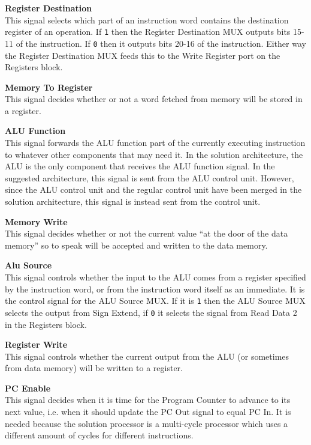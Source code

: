 \begin{description}
\item{\textbf{Register Destination}} \\
This signal selects which part of an instruction word contains the destination register of an operation.
If \texttt{1} then the Register Destination MUX outputs bits 15-11 of the instruction. If \texttt{0} then it outputs bits 20-16 of the instruction.
Either way the Register Destination MUX feeds this to the Write Register port on the Registers block.

\item{\textbf{Memory To Register}} \\
This signal decides whether or not a word fetched from memory will be stored in a register.

\item{\textbf{ALU Function}} \\
This signal forwards the ALU function part of the currently executing instruction to whatever other components that may need it.
In the solution architecture, the ALU is the only component that receives the ALU function signal.
In the suggested architecture, this signal is sent from the ALU control unit.
However, since the ALU control unit and the regular control unit have been merged in the solution architecture, this signal is instead sent from the control unit.

\item{\textbf{Memory Write}} \\
This signal decides whether or not the current value ``at the door of the data memory'' so to speak will be accepted and written to the data memory.

\item{\textbf{Alu Source}} \\
This signal controls whether the input to the ALU comes from a register specified by the instruction word, or from the instruction word itself as an immediate.
It is the control signal for the ALU Source MUX.
If it is \texttt{1} then the ALU Source MUX selects the output from Sign Extend, if \texttt{0} it selects the signal from Read Data 2 in the Registers block.

\item{\textbf{Register Write}} \\
This signal controls whether the current output from the ALU (or sometimes from data memory) will be written to a register.

\item{\textbf{PC Enable}} \\
This signal decides when it is time for the Program Counter to advance to its next value, i.e. when it should update the PC Out signal to equal PC In.
It is needed because the solution processor is a multi-cycle processor which uses a different amount of cycles for different instructions.


\end{description}
